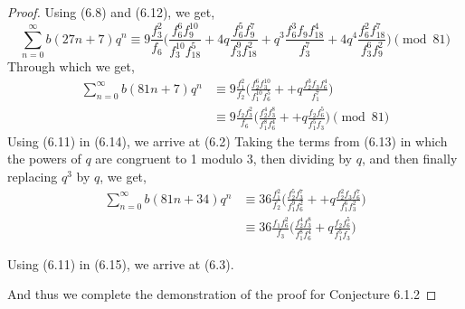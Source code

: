 \begin{proof}
Using (6.8) and (6.12), we get,
\begin{equation}
    \sum_{n=0}^\infty b(27n + 7)q^n \equiv 9 \frac{f_3^2}{f_6}
    \bigg(\frac{f_6^6f_9^{10}}{f_3^{10}f_{18}^5} + 4q\frac{f^5_6f_9^7}{f^9_3f_{18}^2}+q^3\frac{f^3_6f_9f^4_{18}}{f^7_3}+4q^4\frac{f_6^2f_{18}^7}{f_3^6f_9^2}\bigg) \pmod{81}
\end{equation}
Through which we get,
\begin{equation}
\begin{split}
    \sum_{n=0}^\infty b(81n + 7)q^n &\equiv 9 \frac{f_1^2}{f_2}
    \bigg(\frac{f_2^6f_3^{10}}{f_1^{10}f_6^5} + +q\frac{f^3_2f_3f^4_6}{f^7_1}\bigg)
    \\&\equiv 9 \frac{f_2f_3^2}{f_6}
    \bigg(\frac{f_2^4f_3^8}{f_1^8f_6^4} + +q\frac{f_2f^5_6}{f^5_1f_3}\bigg) \pmod{81}
\end{split}
\end{equation}
Using (6.11) in (6.14), we arrive at (6.2)
\newpage
Taking the terms from (6.13) in which the powers of $q$ are congruent to 1 modulo 3, then dividing by $q$, and then finally replacing $q^3$ by $q$, we get,
\begin{equation}
\begin{split}
\sum_{n=0}^\infty b(81n + 34)q^n &\equiv 36 \frac{f_1^2}{f_2}
    \bigg(\frac{f_2^5f_3^7}{f_1^9f_6^2} + +q\frac{f^2_2f_3f^7_6}{f^6_1f_3^2}\bigg)
    \\&\equiv 36 \frac{f_1f_6^2}{f_3}\bigg( \frac{f_2^4f_3^8}{f_1^8f_6^4} + q\frac{f_2f_6^5}{f_1^5f_3} \bigg)
\end{split}
\end{equation}

Using (6.11) in (6.15), we arrive at (6.3).

And thus we complete the demonstration of the proof for Conjecture 6.1.2

\end{proof}
